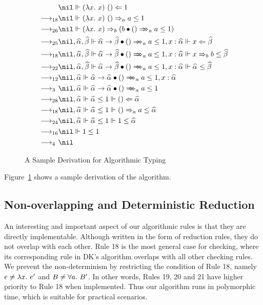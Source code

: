 \begin{figure}
\begin{gather*}
\begin{aligned}
           & \nil \Vdash (\lam x)~() \Lto 1\\
\rrule{18} & \nil \Vdash (\lam x)~() \To_a a\le 1\\
\rrule{26} & \nil \Vdash (\lam x) \To_b (\appInfAlg{b}{()}[a][a\le 1])\\
\rrule{25} & \nil,\al,\bt \Vdash \appInfAlg{\al\to\bt}{()}[a][a\le 1], x:\al \Vdash x\Lto \bt\\
\rrule{18} & \nil,\al,\bt \Vdash \appInfAlg{\al\to\bt}{()}[a][a\le 1], x:\al \Vdash x\To_b b\le \bt\\
\rrule{22} & \nil,\al,\bt \Vdash \appInfAlg{\al\to\bt}{()}[a][a\le 1], x:\al \Vdash \al\le \bt\\
\rrule{12} & \nil,\al \Vdash \appInfAlg{\al\to\al}{()}[a][a\le 1], x:\al\\
\rrule{3}  & \nil,\al \Vdash \appInfAlg{\al\to\al}{()}[a][a\le 1]\\
\rrule{28} & \nil,\al \Vdash \al\le 1 \Vdash () \Lto \al\\
\rrule{18} & \nil,\al \Vdash \al\le 1 \Vdash () \To_a a\le \al\\
\rrule{24} & \nil,\al \Vdash \al\le 1 \Vdash 1\le \al\\
\rrule{16} & \nil \Vdash 1\le 1\\
\rrule{4}  & \nil
\end{aligned}
\end{gather*}
\caption{A Sample Derivation for Algorithmic Typing}
\label{fig:alg:sample}
\end{figure}

Figure~\ref{fig:alg:sample} shows a sample derivation of the
algorithm.

\subsection{Non-overlapping and Deterministic Reduction}
An interesting and important aspect of our algorithmic rules is that
they are directly implementable.
Although written in the form of reduction rules, they do not overlap with each other.
Rule 18 is the most general case for checking,
where its corresponding rule in DK's algorithm overlaps with all other checking rules.
We prevent the non-determinism by restricting the condition of Rule 18,
namely $e\neq\lam e'$ and $B\neq\all B'$.
In other words, Rules 19, 20 and 21 have higher priority to Rule 18 when implemented.
Thus our algorithm runs in polymorphic time, which is suitable for practical scenarios.



